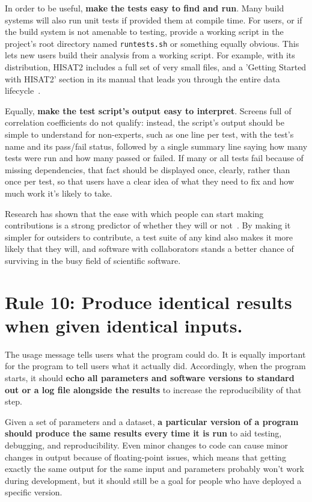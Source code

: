 \documentclass[10pt,letterpaper]{article}
\newcommand{\rulemajor}[1]{\section*{#1}}
\newcommand{\ruleminor}[1]{\textbf{#1}}
\begin{document}
In order to be useful, \ruleminor{make the tests easy to find and
run}.  Many build systems will also run unit tests if provided them
at compile time.  For users, or if the build system is not amenable to
testing, provide a working script in the project's root directory
named \texttt{runtests.sh} or something equally obvious.  This lets
new users build their analysis from a working script.  For example,
with its distribution, HISAT2 includes a full set of very small files,
and a 'Getting Started with HISAT2' section in its manual that leads
you through the entire data lifecycle~\cite{pertea2016}.

Equally, \ruleminor{make the test script's output easy to
interpret}. Screens full of correlation coefficients do not qualify:
instead, the script's output should be simple to understand for
non-experts, such as one line per test, with the test's name and its
pass/fail status, followed by a single summary line saying how many
tests were run and how many passed or failed. If many or all tests
fail because of missing dependencies, that fact should be displayed
once, clearly, rather than once per test, so that users have a clear
idea of what they need to fix and how much work it's likely to take.

Research has shown that the ease with which people can start making
contributions is a strong predictor of whether they will or
not~\cite{steinmacher2015}.  By making it simpler for outsiders to
contribute, a test suite of any kind also makes it more likely that
they will, and software with collaborators stands a better chance of
surviving in the busy field of scientific software.

\rulemajor{Rule 10: Produce identical results when given identical inputs.}

The usage message tells users what the program could do.  It is
equally important for the program to tell users what it actually did.
Accordingly, when the program starts, it should \ruleminor{echo all
parameters and software versions to standard out or a log file
alongside the results} to increase the reproducibility of that step.

Given a set of parameters and a dataset, \ruleminor{a particular
version of a program should produce the same results every time it
is run} to aid testing, debugging, and reproducibility.  Even minor
changes to code can cause minor changes in output because of
floating-point issues, which means that getting exactly the same
output for the same input and parameters probably won't work during
development, but it should still be a goal for people who have
deployed a specific version.
\end{document}
